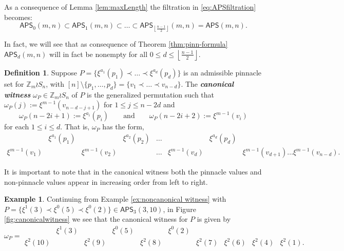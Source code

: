 \documentclass[12pt,reqno]{amsart}
\numberwithin{equation}{section}
\theoremstyle{plain}
\theoremstyle{definition}
\newtheorem{definition}[theorem]{Definition}
\newtheorem{example}[theorem]{Example}
\theoremstyle{remark}
\newcommand{\Z}{\mathbb{Z}}
\newcommand\APS{\mathsf{APS}}
\newcommand{\floor}[1]{\left\lfloor#1\right\rfloor}
\newcommand{\newword}[1]{\emph{\textbf{#1}}}
\begin{document}
As a consequence of Lemma \ref{lem:maxLength} the filtration in \eqref{eq:APSfiltration} becomes:
\begin{equation}\label{eq:APSfiltration2}
\APS_0(m,n) \subset \APS_1(m,n) \subset \dots \subset \APS_{\floor{\frac{n-1}{2}}}(m,n)=\APS(m,n).
\end{equation}

In fact, we will see that as consequence of Theorem \ref{thm:pinn-formula} $\APS_d(m,n)$ will in fact be nonempty for all $0\leq d \leq \floor{\frac{n-1}{2}}$.

\begin{definition} \label{def:witness}
Suppose $P = \{ \xi^{a_1}(p_1) \prec \dots \prec \xi^{a_d}(p_d)\}$ is an admissible pinnacle set for $\Z_m \wr S_n$, with $[n]\setminus \{p_1,\dots,p_d\}= \{v_1\prec \dots\prec v_{n-d}\}$. The \newword{canonical witness} $\omega_P \in \Z_m \wr S_n$ of $P$ is the generalized permutation such that $\omega_P(j) := \xi^{m-1}(v_{n-d-j+1})$ for $1\leq j \leq n-2d$ and 
\[
\omega_P(n-2i+1) := \xi^{a_{i}}(p_{i}) 
\qquad \text{and} \qquad 
\omega_P(n-2i+2):= \xi^{m-1}(v_{i})
\]
for each $1\leq i \leq d$. That is, $\omega_P$ has the form, 
\begin{equation*}
\begin{matrix}
    & \xi^{a_1}(p_1) && \xi^{a_2}(p_2) & \dots && \xi^{a_d}(p_d)  
    \\
    \xi^{m-1}(v_{1}) &&\xi^{m-1}(v_{2}) && \dots & \xi^{m-1}(v_{d}) && \xi^{m-1}(v_{d+1}) \dots \xi^{m-1}(v_{n-d}).      
\end{matrix}
\end{equation*}
\end{definition}

It is important to note that in the canonical witness both the pinnacle values and non-pinnacle values appear in increasing order from left to right. 

\begin{example}
    Continuing from Example \ref{ex:noncanonical witness} with $P =\{\xi^1(3)\prec \xi^0(5)\prec \xi^0(2)\} \in \APS_3(3,10)$, in Figure \ref{fig:canonicalwitness} we see that the canonical witness for $P$ is given by
\[\omega_P =
\begin{matrix}
&\xi^1(3)&&\xi^0(5)&&\xi^0(2)&&&&\\
\xi^2(10)&&\xi^2(9)&&\xi^2(8)&&\xi^2(7)&\xi^2(6)&\xi^2(4)&\xi^2(1).
\end{matrix}
\] 
\end{example}
\end{document}
